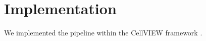 \section{Implementation}

We implemented the pipeline within the CellVIEW framework \cite{muzic15}.



